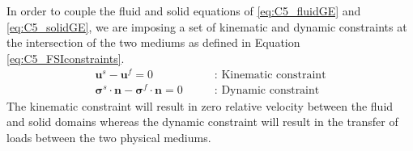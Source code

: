 In order to couple the fluid and solid equations of \eqref{eq:C5_fluidGE} and \eqref{eq:C5_solidGE}, we are imposing a set of kinematic and dynamic constraints \cite{van2007comparison} at the intersection of the two mediums as defined in Equation \eqref{eq:C5_FSIconstraints}.
%
\begin{subequations}\label{eq:C5_FSIconstraints}
\begin{align}
	\mathbf{u}^s - \mathbf{u}^f = 0
	\quad \quad &\text{: Kinematic constraint}
	\\
	\mathbf{\sigma}^s \cdot \mathbf{n} - \mathbf{\sigma}^f \cdot \mathbf{n} = 0
	\quad \quad &\text{: Dynamic constraint}
\end{align}
\end{subequations}
%
The kinematic constraint will result in zero relative velocity between the fluid and solid domains whereas the dynamic constraint will result in the transfer of loads between the two physical mediums.
